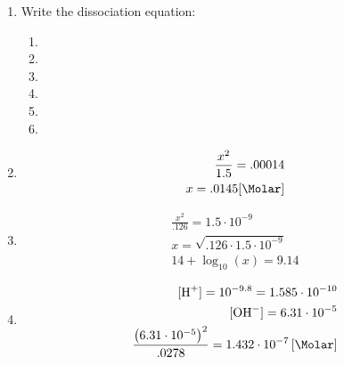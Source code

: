 \documentclass[12pt]{article}
\begin{document}
\begin{enumerate}
\begin{enumerate}
    \end{enumerate}

  \item Write the dissociation equation:

    \begin{enumerate}

      \item {}

      \item {}

      \item {}

      \item {}

      \item {}

      \item {}

    \end{enumerate}

  \item

    \begin{equation}
      \begin{split}
        \frac{x^2}{1.5}=.00014\\
        x=.0145[\si{\Molar}]
      \end{split}
      \label{5}
    \end{equation}

  \item

    \begin{equation}
      \begin{split}
        \frac{x^2}{.126}=1.5\cdot10^{-9}\\
        x=\sqrt{.126\cdot1.5\cdot10^{-9}}\\
        14+\log_{10}\left( x  \right)=9.14
      \end{split}
      \label{6}
    \end{equation}

  \item

    \begin{equation}
      \begin{split}
        [\ce{H+}]=10^{-9.8}=1.585\cdot10^{-10}\\
        [\ce{OH-}]=6.31\cdot10^{-5}\\
        \frac{\left( 6.31\cdot10^{-5} \right)^2}{.0278}=1.432\cdot10^{-7}\left[ \si{\Molar} \right]
      \end{split}
      \label{7}
    \end{equation}


\end{enumerate}
\end{document}

